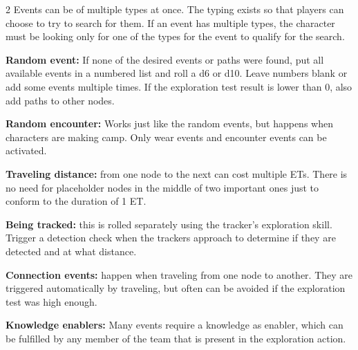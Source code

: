 \begin{multicols}{2}
Events can be of multiple types at once. The typing exists so that players can choose to try to search for them. If an event has multiple types, the character must be looking only for one of the types for the event to qualify for the search.

\textbf{Random event:} If none of the desired events or paths were found, put all available events in a numbered list and roll a d6 or d10. Leave numbers blank or add some events multiple times. If the exploration test result is lower than 0, also add paths to other nodes.

\textbf{Random encounter:} Works just like the random events, but happens when characters are making camp. Only wear events and encounter events can be activated.

\textbf{Traveling distance:} from one node to the next can cost multiple ETs. There is no need for placeholder nodes in the middle of two important ones just to conform to the duration of 1 ET. 

\textbf{Being tracked:} this is rolled separately using the tracker's exploration skill. Trigger a detection check when the trackers approach to determine if they are detected and at what distance.

\textbf{Connection events:} happen when traveling from one node to another. They are triggered automatically by traveling, but often can be avoided if the exploration test was high enough.

\textbf{Knowledge enablers:} Many events require a knowledge as enabler, which can be fulfilled by any member of the team that is present in the exploration action.





\end{multicols}
